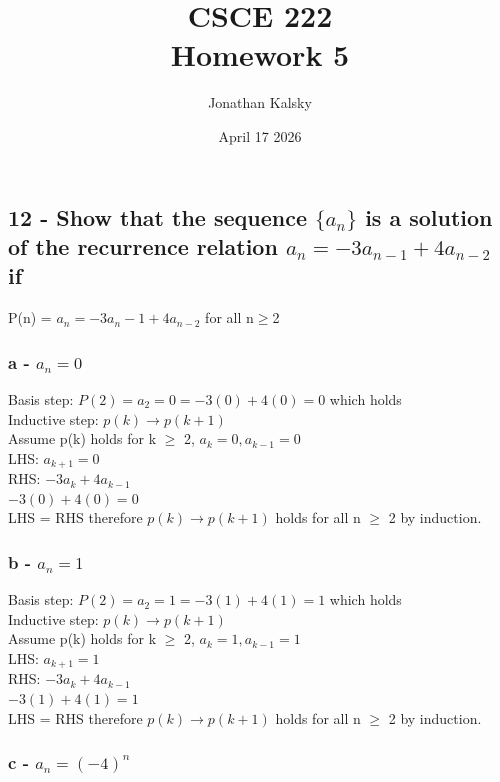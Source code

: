 \documentclass{article}
\author{Jonathan Kalsky}
\date{April 17 2026}
\title{\normalsize CSCE 222\\ \Large Homework 5}
\begin{document}
\maketitle
\tableofcontents
\vspace{1cm}

\subsection[12]{12 - Show that the sequence $\{a_n\}$ is a solution of the recurrence relation $a_n = -3a_{n-1} + 4a_{n-2}$ if}
P(n) = $a_n = -3{a_n-1} + 4a_{n-2}$ for all n$\geq$2\\
\subsubsection[a]{a - $a_n = 0$}
Basis step:
$P(2) = a_2 = 0 = -3(0) + 4(0) = 0$ which holds\\
Inductive step:
$p(k) \to p(k+1)$\\
Assume p(k) holds for k $\geq$ 2, $a_k = 0, a_{k-1} = 0$\\
LHS: $a_{k+1} = 0$\\
RHS: $-3{a_k} + 4a_{k-1}$\\
$-3{(0)} + 4{(0)} = 0$\\
LHS = RHS therefore $p(k) \to p(k+1)$ holds for all n $\geq$ 2 by induction.

\subsubsection[b]{b - $a_n = 1$}
Basis step:
$P(2) = a_2 = 1 = -3(1) + 4(1) = 1$ which holds\\
Inductive step:
$p(k) \to p(k+1)$\\
Assume p(k) holds for k $\geq$ 2, $a_k = 1, a_{k-1} = 1$\\
LHS: $a_{k+1} = 1$\\
RHS: $-3{a_k} + 4a_{k-1}$\\
$-3{(1)} + 4{(1)} = 1$\\
LHS = RHS therefore $p(k) \to p(k+1)$ holds for all n $\geq$ 2 by induction.

\subsubsection[c]{c - $a_n = (-4)^n$}
\end{document}

